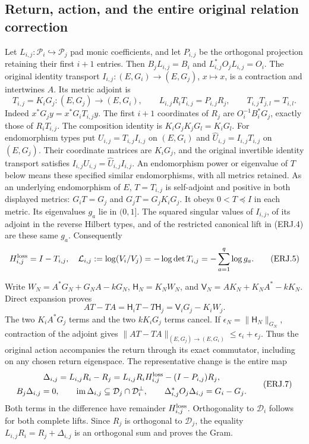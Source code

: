 \subsection{Return, action, and the entire original relation correction}
Let $L_{i,j}:\mathcal P_i\hookrightarrow\mathcal P_j$ pad monic
coefficients, and let $P_{i,j}$ be the orthogonal projection retaining
their first $i+1$ entries. Then $B_jL_{i,j}=B_i$ and
$L_{i,j}^*O_jL_{i,j}=O_i$. The original identity transport
$I_{i,j}:(E,G_i)\to(E,G_j)$, $x\mapsto x$, is a contraction and
intertwines $A$. Its metric adjoint is
\[
 T_{i,j}=K_iG_j:(E,G_j)\longrightarrow(E,G_i),\qquad
 L_{i,j}R_iT_{i,j}=P_{i,j}R_j,\qquad
 T_{i,j}T_{j,l}=T_{i,l}.\tag{ERJ.4}
\]
Indeed $x^*G_jy=x^*G_iT_{i,j}y$. The first $i+1$ coordinates of
$R_j$ are $O_i^{-1}B_i^*G_j$, exactly those of $R_iT_{i,j}$.
The composition identity is $K_iG_jK_jG_l=K_iG_l$.
For endomorphism types put $U_{i,j}=T_{i,j}I_{i,j}$ on $(E,G_i)$
and $\widehat U_{i,j}=I_{i,j}T_{i,j}$ on $(E,G_j)$.
Their coordinate matrices are $K_iG_j$, and the original invertible
identity transport satisfies $I_{i,j}U_{i,j}=\widehat U_{i,j}I_{i,j}$.
An endomorphism power or eigenvalue of $T$ below means these
specified similar endomorphisms, with all metrics retained.
As an underlying endomorphism of $E$, $T=T_{i,j}$ is self-adjoint
and positive in both displayed metrics: $G_iT=G_j$ and
$G_jT=G_jK_iG_j$. It obeys $0<T\preceq I$ in each metric.
Its eigenvalues $g_a$ lie in $(0,1]$. The squared singular values
of $I_{i,j}$, of its adjoint in the reverse Hilbert types, and of the
restricted canonical lift in (ERJ.4) are these same $g_a$.
Consequently
\[
 H_{i,j}^{\rm loss}=I-T_{i,j},\quad
 \mathcal L_{i,j}:=\log(V_i/V_j)
 =-\log\det T_{i,j}=-\sum_{a=1}^q\log g_a.\tag{ERJ.5}
\]

Write $W_N=A^*G_N+G_NA-kG_N$,
$\mathsf H_N=K_NW_N$, and
$\mathsf V_N=AK_N+K_NA^*-kK_N$. Direct expansion proves
\[
 AT-TA=\mathsf H_iT-T\mathsf H_j
       =\mathsf V_iG_j-K_iW_j.\tag{ERJ.6}
\]
The two $K_iA^*G_j$ terms and the two $kK_iG_j$ terms cancel.
If $\epsilon_N=\|\mathsf H_N\|_{G_N}$, contraction of the adjoint
gives $\|AT-TA\|_{(E,G_j)\to(E,G_i)}\le\epsilon_i+\epsilon_j$.
Thus the original action accompanies the return through its exact
commutator, including on any chosen return eigenspace.
The representative change is the entire map
\[
\begin{gathered}
 \Delta_{i,j}=L_{i,j}R_i-R_j
 =L_{i,j}R_iH_{i,j}^{\rm loss}-(I-P_{i,j})R_j,\\
 B_j\Delta_{i,j}=0,\qquad
 \operatorname{im}\Delta_{i,j}\subseteq\mathcal D_j\cap\mathcal D_i^\perp,
 \qquad \Delta_{i,j}^*O_j\Delta_{i,j}=G_i-G_j.
\end{gathered}\tag{ERJ.7}
\]
Both terms in the difference have remainder $H_{i,j}^{\rm loss}$.
Orthogonality to $\mathcal D_i$ follows for both complete lifts.
Since $R_j$ is orthogonal to $\mathcal D_j$, the equality
$L_{i,j}R_i=R_j+\Delta_{i,j}$ is an orthogonal sum and proves the Gram.

